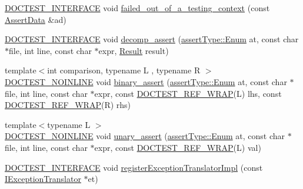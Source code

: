 \begin{DoxyCompactItemize}
\item 
\hyperlink{doctest_8h_a9c16ffc635ec47f07797d21ede26b1a5}{D\+O\+C\+T\+E\+S\+T\+\_\+\+I\+N\+T\+E\+R\+F\+A\+CE} void \hyperlink{namespacedoctest_1_1detail_a0ff832be68bf666d856aefd539e1ce81}{failed\+\_\+out\+\_\+of\+\_\+a\+\_\+testing\+\_\+context} (const \hyperlink{structdoctest_1_1AssertData}{Assert\+Data} \&ad)
\item 
\hyperlink{doctest_8h_a9c16ffc635ec47f07797d21ede26b1a5}{D\+O\+C\+T\+E\+S\+T\+\_\+\+I\+N\+T\+E\+R\+F\+A\+CE} void \hyperlink{namespacedoctest_1_1detail_a6d4efb043e9e5a6fa0db64f0e230a7a7}{decomp\+\_\+assert} (\hyperlink{namespacedoctest_1_1assertType_ae1bb5bed722f34f1c38b83cb19d326d3}{assert\+Type\+::\+Enum} at, const char $\ast$file, int line, const char $\ast$expr, \hyperlink{structdoctest_1_1detail_1_1Result}{Result} result)
\item 
{\footnotesize template$<$int comparison, typename L , typename R $>$ }\\\hyperlink{doctest_8h_a47e9d3609dfcc90b9a630ff33b9524d6}{D\+O\+C\+T\+E\+S\+T\+\_\+\+N\+O\+I\+N\+L\+I\+NE} void \hyperlink{namespacedoctest_1_1detail_a570279a22ca888528e87a426853a0288}{binary\+\_\+assert} (\hyperlink{namespacedoctest_1_1assertType_ae1bb5bed722f34f1c38b83cb19d326d3}{assert\+Type\+::\+Enum} at, const char $\ast$file, int line, const char $\ast$expr, const \hyperlink{doctest_8h_af2901cafb023c57fb672ccb1bf14f2eb}{D\+O\+C\+T\+E\+S\+T\+\_\+\+R\+E\+F\+\_\+\+W\+R\+AP}(L) lhs, const \hyperlink{doctest_8h_af2901cafb023c57fb672ccb1bf14f2eb}{D\+O\+C\+T\+E\+S\+T\+\_\+\+R\+E\+F\+\_\+\+W\+R\+AP}(R) rhs)
\item 
{\footnotesize template$<$typename L $>$ }\\\hyperlink{doctest_8h_a47e9d3609dfcc90b9a630ff33b9524d6}{D\+O\+C\+T\+E\+S\+T\+\_\+\+N\+O\+I\+N\+L\+I\+NE} void \hyperlink{namespacedoctest_1_1detail_a5343d1b26df7f86767d5e7026c03bf0f}{unary\+\_\+assert} (\hyperlink{namespacedoctest_1_1assertType_ae1bb5bed722f34f1c38b83cb19d326d3}{assert\+Type\+::\+Enum} at, const char $\ast$file, int line, const char $\ast$expr, const \hyperlink{doctest_8h_af2901cafb023c57fb672ccb1bf14f2eb}{D\+O\+C\+T\+E\+S\+T\+\_\+\+R\+E\+F\+\_\+\+W\+R\+AP}(L) val)
\item 
\hyperlink{doctest_8h_a9c16ffc635ec47f07797d21ede26b1a5}{D\+O\+C\+T\+E\+S\+T\+\_\+\+I\+N\+T\+E\+R\+F\+A\+CE} void \hyperlink{namespacedoctest_1_1detail_a3887426da16e0d12e6f0e270a767a6a5}{register\+Exception\+Translator\+Impl} (const \hyperlink{structdoctest_1_1detail_1_1IExceptionTranslator}{I\+Exception\+Translator} $\ast$et)

\end{DoxyCompactItemize}
